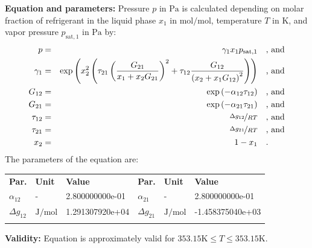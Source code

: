 \textbf{Equation and parameters:}
\newline
%
Pressure $p$ in $\si{\pascal}$ is calculated depending on molar fraction of refrigerant in the liquid phase $x_1$ in $\si{\mole\per\mole}$, temperature $T$ in $\si{\kelvin}$, and vapor pressure $p_\mathrm{sat,1}$ in $\si{\pascal}$ by:
%
\begin{equation*}
\begin{split}
p &=& \gamma_1 x_1 p_\mathrm{sat,1} & \quad\text{, and} \\
\gamma_1 &=& \exp \left( x_2^2 \left( \tau_{21} \left( \frac{G_{21}}{x_1 + x_2 G_{21}} \right) ^2 + \tau_{12} \frac{G_{12}}{\left( x_2 + x_1 G_{12} \right) ^2}\right) \right) & \quad\text{, and} \\
G_{12} &=& \exp \left( -\alpha_{12} \tau_{12} \right) & \quad\text{, and} \\
G_{21} &=& \exp \left( -\alpha_{21} \tau_{21} \right) & \quad\text{, and} \\
\tau_{12} &=& \nicefrac{\Delta g_{12}}{R T} & \quad\text{, and} \\
\tau_{21} &=& \nicefrac{\Delta g_{21}}{R T} & \quad\text{, and} \\
x_2 &=& 1 - x_1  & \quad\text{.} \\
\end{split}
\end{equation*}
%
The parameters of the equation are:
%
\begin{longtable}[l]{lll|lll}
\toprule
\addlinespace
\textbf{Par.} & \textbf{Unit} & \textbf{Value} &	\textbf{Par.} & \textbf{Unit} & \textbf{Value} \\
\addlinespace
\midrule
\endhead

\bottomrule
\endfoot
\bottomrule
\endlastfoot
\addlinespace

$\alpha_{12}$ & - & 2.800000000e-01 & $\alpha_{21}$ & - & 2.800000000e-01 \\
$\Delta g_{12}$ & $\si{\joule\per\mole}$ & 1.291307920e+04 & $\Delta g_{21}$ & $\si{\joule\per\mole}$ & -1.458375040e+03 \\

\addlinespace\end{longtable}

\textbf{Validity:}
\newline
Equation is approximately valid for $353.15 \si{\kelvin} \leq T \leq 353.15 \si{\kelvin}$.
\newline

